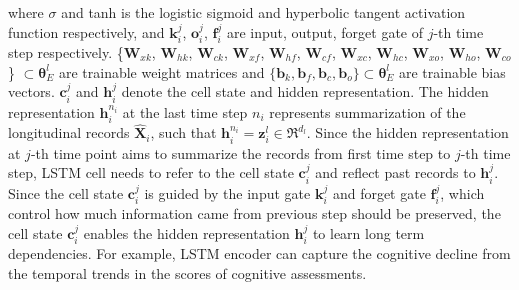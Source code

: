 where $\sigma$ and tanh is the logistic sigmoid and hyperbolic tangent activation function respectively, and $\mathbf{k}^j_i$, $\mathbf{o}^j_i$, $\mathbf{f}^j_i$ are input, output, forget gate of $j$-th time step respectively. \{$\mathbf{W}_{xk}$, $\mathbf{W}_{hk}$, $\mathbf{W}_{ck}$, $\mathbf{W}_{xf}$, $\mathbf{W}_{hf}$, $\mathbf{W}_{cf}$, $\mathbf{W}_{xc}$, $\mathbf{W}_{hc}$, $\mathbf{W}_{xo}$, $\mathbf{W}_{ho}$, $\mathbf{W}_{co}$\} $\subset \mathbf{\theta}_{E}^l$ are trainable weight matrices and $\{\mathbf{b}_k, \mathbf{b}_f, \mathbf{b}_c, \mathbf{b}_o\} \subset \mathbf{\theta}_{E}^l$ are trainable bias vectors. $\mathbf{c}_i^j$ and $\mathbf{h}_i^j$ denote the cell state and hidden representation. The hidden representation $\mathbf{h}_i^{n_i}$ at the last time step $n_i$ represents summarization of the longitudinal records $\hat{\mathbf{X}}_i$, such that $\mathbf{h}_i^{n_i} = \mathbf{z}_i^l \in \Re^{d_l}$. Since the hidden representation at $j$-th time point aims to summarize the records from first time step to $j$-th time step, LSTM cell needs to refer to the cell state $\mathbf{c}_i^j$ and reflect past records to $\mathbf{h}_i^j$. Since the cell state $\mathbf{c}_i^j$ is guided by the input gate $\mathbf{k}_i^j$ and forget gate $\mathbf{f}_i^j$, which control how much information came from previous step should be preserved, the cell state $\mathbf{c}_i^j$ enables the hidden representation $\mathbf{h}_i^j$ to learn long term dependencies. For example, LSTM encoder can capture the cognitive decline from the temporal trends in the scores of cognitive assessments.

